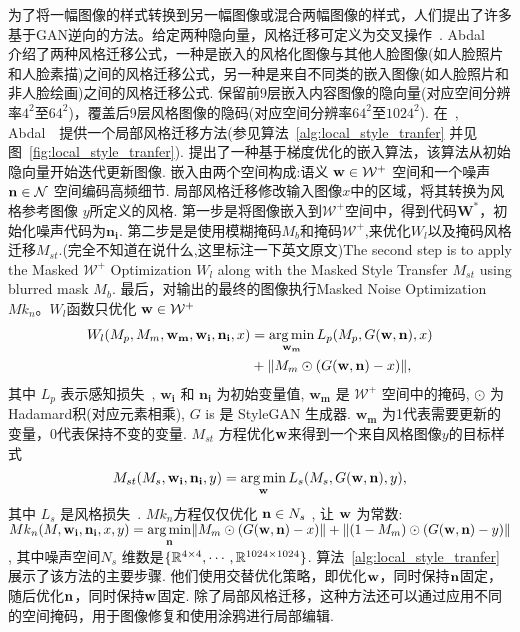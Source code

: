 为了将一幅图像的样式转换到另一幅图像或混合两幅图像的样式，人们提出了许多基于GAN逆向的方法。给定两种隐向量，风格迁移可定义为交叉操作~\cite{karras2019style,abdal2019image2stylegan}.
Abdal~\etal~\cite{abdal2019image2stylegan} 介绍了两种风格迁移公式，一种是嵌入的风格化图像与其他人脸图像(如人脸照片和人脸素描)之间的风格迁移公式，另一种是来自不同类的嵌入图像(如人脸照片和非人脸绘画)之间的风格迁移公式. 
保留前9层嵌入内容图像的隐向量(对应空间分辨率$4^{2}$至$64^{2}$)，覆盖后9层风格图像的隐码(对应空间分辨率$64^{2}$至$1024^{2}$).
在~\cite{abdal2020image2stylegan2}, Abdal~\etal~提供一个局部风格迁移方法(参见算法~\ref{alg:local_style_tranfer} 并见图~\ref{fig:local_style_tranfer}).
提出了一种基于梯度优化的嵌入算法，该算法从初始隐向量开始迭代更新图像. 
嵌入由两个空间构成:语义 $\mathbf{w} \in \mathcal{W^{+}}$ 空间和一个噪声$\mathbf{n} \in \mathcal{N}$ 空间编码高频细节.
局部风格迁移修改输入图像$x$中的区域，将其转换为风格参考图像 $y$所定义的风格. 
第一步是将图像嵌入到$\mathcal{W}^{+}$空间中，得到代码$\mathbf{W ^*}$，初始化噪声代码为$\mathbf{n_i}$.
第二步是是使用模糊掩码$M_b$和掩码$\mathcal{W}^{+}$,来优化$W_{l}$以及掩码风格迁移$M_{st}$.(完全不知道在说什么,这里标注一下英文原文)The second step is to apply the Masked $\mathcal{W}^{+}$ Optimization $W_{l}$ along with the Masked Style Transfer $M_{st}$ using blurred mask $M_b$. 
最后，对输出的最终的图像执行Masked Noise Optimization $M k_{n}$。$W_{l}$函数只优化 $\mathbf{w} \in \mathcal{W}^{+}$
\begin{equation}
\begin{aligned}
W_l(M_p, M_m, \mathbf{w_m}, \mathbf{w_i}, \mathbf{n_i},x) & = \underset{\mathbf{w_m}}{\arg\min}\, L_p(M_{p}, G(\w, \n), x) \\
& + \|M_{m} \odot (G(\w, \n) - x)\|,
\end{aligned}
\label{eqn:ml}
\end{equation}
其中 $L_p$ 表示感知损失~\cite{johnson2016perceptual},
$\mathbf{w_i}$ 和 $\mathbf{n_i}$ 为初始变量值, 
$\mathbf{w_m}$ 是 $\mathcal{W}^{+}$ 空间中的掩码, $\odot$ 为Hadamard积(对应元素相乘),  $G$ is 是 StyleGAN 生成器.
$\mathbf{w_m}$ 为1代表需要更新的变量，0代表保持不变的变量.
$M_{st}$ 方程优化$\mathbf{w}$来得到一个来自风格图像$y$的目标样式
\begin{equation}
M_{st}(M_{s},\mathbf{w_i},\mathbf{n_i}, y) = \underset{\w}{\arg\min}\, L_s (M_s, G(\w, \n), y), 
\label{eqn:mst}
\end{equation}
其中 $L_s$ 是风格损失~\cite{gatys2016image}.
 ${Mk}_{n}$方程仅仅优化 $\mathbf{n} \in N_s$ , 让 $\mathbf{w}$ 为常数: ${Mk}_{n}(M, \mathbf{w_i},\mathbf{n_i}, x, y) = \underset{\mathbf{n}}{\arg\min} \|M_m \odot (G(\mathbf{w}, \mathbf{n}) - x)\|
+ \|(1 - M_m) \odot (G(\mathbf{w}, \mathbf{n}) - y)\|$, 其中噪声空间$N_s$ 维数是$\{\mathbb{R}^{4\times4}, \cdots,\mathbb{R}^{1024\times1024}\}$.
算法~\ref{alg:local_style_tranfer}展示了该方法的主要步骤. 
他们使用交替优化策略，即优化$\mathbf{w}$，同时保持$\mathbf{n}$固定，随后优化$\mathbf{n}$，同时保持$\mathbf{w}$固定.
除了局部风格迁移，这种方法还可以通过应用不同的空间掩码，用于图像修复和使用涂鸦进行局部编辑.

